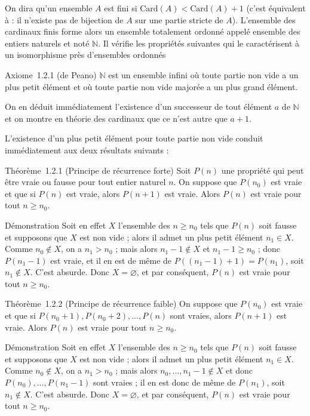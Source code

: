 On dira qu'un ensemble $A$ est fini si $\text{Card}(A) < \text{Card}(A) + 1$ (c'est équivalent à : il
n'existe pas de bijection de $A$ sur une partie stricte de $A$). L'ensemble
des cardinaux finis forme alors un ensemble totalement ordonné appelé
ensemble des entiers naturels et noté $\mathbb{N}$. Il vérifie les propriétés
suivantes qui le caractérisent à un isomorphisme près d'ensembles
ordonnés

Axiome~1.2.1 (de Peano) $\mathbb{N}$ est un ensemble infini où toute partie non
vide a un plus petit élément et où toute partie non vide majorée a un
plus grand élément.

On en déduit immédiatement l'existence d'un successeur de tout élément $a$
de $\mathbb{N}$ et on montre en théorie des cardinaux que ce n'est autre que $a + 1$.

L'existence d'un plus petit élément pour toute partie non vide conduit
immédiatement aux deux résultats suivants :

Théorème~1.2.1 (Principe de récurrence forte) Soit $P(n)$ une propriété
qui peut être vraie ou fausse pour tout entier naturel $n$. On suppose que
$P(n_0)$ est vraie et que si $P(n)$ est vraie, alors $P(n + 1)$ est
vraie. Alors $P(n)$ est vraie pour tout $n \geq n_0$.

Démonstration Soit en effet $X$ l'ensemble des $n \geq n_0$ tels que
$P(n)$ soit fausse et supposons que $X$ est non vide ; alors il admet un
plus petit élément $n_1 \in X$. Comme
$n_0 \notin X$, on a $n_1 > n_0$ ; mais alors $n_1 - 1 \notin X$ et $n_1 - 1 \geq n_0$ ; donc
$P(n_1 - 1)$ est vraie, et il en est de même de $P((n_1 - 1) + 1) = P(n_1)$, soit
$n_1 \notin X$. C'est absurde. Donc $X = \varnothing$, et
par conséquent, $P(n)$ est vraie pour tout $n \geq n_0$.

Théorème~1.2.2 (Principe de récurrence faible) On suppose que
$P(n_0)$ est vraie et que si $P(n_0 + 1), P(n_0 + 2), \ldots, P(n)$
sont vraies, alors $P(n + 1)$ est vraie. Alors $P(n)$ est vraie pour tout $n \geq n_0$.

Démonstration Soit en effet $X$ l'ensemble des $n \geq n_0$ tels que
$P(n)$ soit fausse et supposons que $X$ est non vide ; alors il admet un
plus petit élément $n_1 \in X$. Comme
$n_0 \notin X$, on a $n_1 > n_0$ ; mais alors
$n_0, \ldots, n_1 - 1 \notin X$ et donc
$P(n_0), \ldots, P(n_1 - 1)$ sont vraies ; il en est donc de même de $P(n_1)$, soit
$n_1 \notin X$. C'est absurde. Donc $X = \varnothing$, et
par conséquent, $P(n)$ est vraie pour tout $n \geq n_0$.